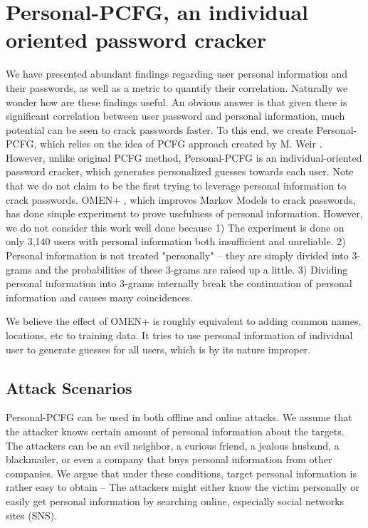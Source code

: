 \section{Personal-PCFG, an individual oriented password cracker}
\label{personalpcfg}
We have presented abundant findings regarding user personal information and their passwords, as well as a metric to quantify their correlation. Naturally we wonder how are these findings useful. An obvious answer is that given there is significant correlation between user password and personal information, much potential can be seen to crack passwords faster. To this end, we create Personal-PCFG, which relies on the idea of PCFG approach created by M. Weir \cite{weir2009password}. However, unlike original PCFG method, Personal-PCFG is an individual-oriented password cracker, which generates personalized guesses towards each user. Note that we do not claim to be the first trying to leverage personal information to crack passwords. OMEN+ \cite{castelluccia2013privacy}, which improves Markov Models \cite{narayanan2005fast} to crack passwords, has done simple experiment to prove usefulness of personal information. However, we do not consider this work well done because 1) The experiment is done on only 3,140 users with personal information both insufficient and unreliable. 2) Personal information is not treated "personally" -- they are simply divided into 3-grams and the probabilities of these 3-grams are raised up a little. 3) Dividing personal information into 3-grams internally break the continuation of personal information and causes many coincidences. 

We believe the effect of OMEN+ \cite{castelluccia2013privacy} is roughly equivalent to adding common names, locations, etc to training data. It tries to use personal information of individual user to generate guesses for all users, which is by its nature improper. 


\subsection{Attack Scenarios}
Personal-PCFG can be used in both offline and online attacks. We assume that the attacker knows certain amount of personal information about the targets. The attackers can be an evil neighbor, a curious friend, a jealous husband, a blackmailer, or even a company that buys personal information from other companies. We argue that under these conditions, target personal information is rather easy to obtain -- The attackers might either know the victim personally or easily get personal information by searching online, especially social networks sites (SNS). 

